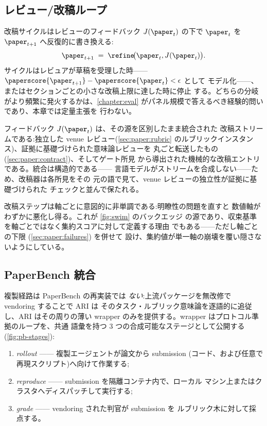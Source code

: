 \subsection{レビュー/改稿ループ}\label{sec:paper:loop}

改稿サイクルはレビューのフィードバック $J(\paper_t)$ の下で
$\paper_t$ を $\paper_{t+1}$ へ反復的に書き換える:
\begin{equation}\label{eq:refine}
  \paper_{t+1} \;=\; \refine\!\bigl(\paper_t, J(\paper_t)\bigr).
\end{equation}
サイクルはレビュアが草稿を受理した時——
$\paperscore{\paper_{t+1}}-\paperscore{\paper_t}<\epsilon$ として
モデル化——、またはセクションごとの小さな改稿上限に達した時に停止
する。どちらの分岐がより頻繁に発火するかは、\cref{chapter:eval}
がパネル規模で答えるべき経験的問いであり、本章では定量主張を
行わない。

フィードバック $J(\paper_t)$ は、その源を区別したまま統合された
改稿ストリームである:独立した venue レビュー(\cref{sec:paper:rubric}
のルブリックインスタンス)、証拠に基礎づけられた意味論レビューを
丸ごと転送したもの(\cref{sec:paper:contract})、そしてゲート所見
から導出された機械的な改稿エントリである。統合は構造的である——
言語モデルがストリームを合成しない——ため、改稿器は各所見をその
元の語で見て、venue レビューの独立性が証拠に基礎づけられた
チェックと並んで保たれる。

改稿ステップは軸ごとに意図的に非単調である:明瞭性の問題を直すと
数値軸がわずかに悪化し得る。これが \cref{fig:swim} のバックエッジ
の源であり、収束基準を軸ごとではなく集約スコアに対して定義する理由
でもある——ただし軸ごとの下限 (\cref{sec:paper:failures}) を併せて
設け、集約値が単一軸の崩壊を覆い隠さないようにしている。

\subsection{PaperBench 統合}\label{sec:paper:paperbench}

複製経路は PaperBench \cite{starace2025paperbench} の再実装では
\emph{ない}:上流パッケージを無改修で vendoring することで ARI は
そのタスク・ルブリック意味論を逐語的に追従し、ARI はその周りの薄い
wrapper のみを提供する。wrapper はプロトコル準拠のループを、共通
語彙を持つ 3 つの合成可能なステージとして公開する
(\cref{fig:pb-stages}):

\begin{enumerate}
  \item \emph{rollout} —— 複製エージェントが論文から submission
        (コード、および任意で再現スクリプト)へ向けて作業する;
  \item \emph{reproduce} —— submission を隔離コンテナ内で、ローカル
        マシン上またはクラスタへディスパッチして実行する;
  \item \emph{grade} —— vendoring された判官が submission を
        ルブリック木に対して採点する。
\end{enumerate}

